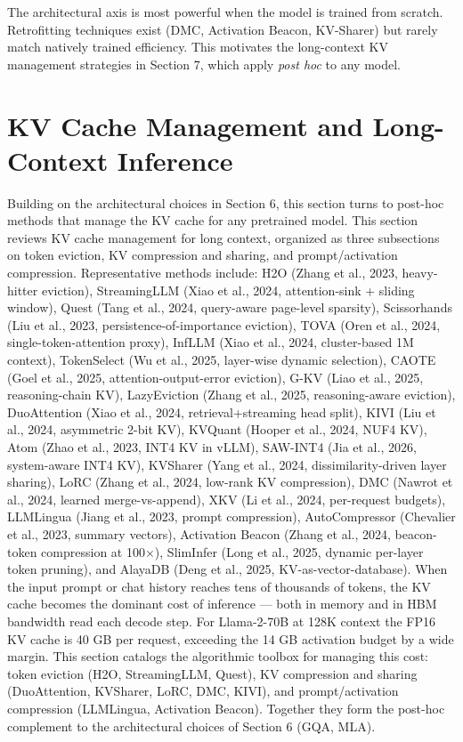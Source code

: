 \documentclass{article}
\begin{document}
The architectural axis is most powerful when the model is trained from scratch. Retrofitting techniques exist (DMC, Activation Beacon, KV-Sharer) but rarely match natively trained efficiency. This motivates the long-context KV management strategies in Section 7, which apply \emph{post hoc} to any model.

\section{KV Cache Management and Long-Context Inference}\label{kv-cache-management-and-long-context-inference}

Building on the architectural choices in Section 6, this section turns to post-hoc methods that manage the KV cache for any pretrained model. This section reviews KV cache management for long context, organized as three subsections on token eviction, KV compression and sharing, and prompt/activation compression. Representative methods include: H2O (Zhang et al., 2023, heavy-hitter eviction), StreamingLLM (Xiao et al., 2024, attention-sink + sliding window), Quest (Tang et al., 2024, query-aware page-level sparsity), Scissorhands (Liu et al., 2023, persistence-of-importance eviction), TOVA (Oren et al., 2024, single-token-attention proxy), InfLLM (Xiao et al., 2024, cluster-based 1M context), TokenSelect (Wu et al., 2025, layer-wise dynamic selection), CAOTE (Goel et al., 2025, attention-output-error eviction), G-KV (Liao et al., 2025, reasoning-chain KV), LazyEviction (Zhang et al., 2025, reasoning-aware eviction), DuoAttention (Xiao et al., 2024, retrieval+streaming head split), KIVI (Liu et al., 2024, asymmetric 2-bit KV), KVQuant (Hooper et al., 2024, NUF4 KV), Atom (Zhao et al., 2023, INT4 KV in vLLM), SAW-INT4 (Jia et al., 2026, system-aware INT4 KV), KVSharer (Yang et al., 2024, dissimilarity-driven layer sharing), LoRC (Zhang et al., 2024, low-rank KV compression), DMC (Nawrot et al., 2024, learned merge-vs-append), XKV (Li et al., 2024, per-request budgets), LLMLingua (Jiang et al., 2023, prompt compression), AutoCompressor (Chevalier et al., 2023, summary vectors), Activation Beacon (Zhang et al., 2024, beacon-token compression at 100×), SlimInfer (Long et al., 2025, dynamic per-layer token pruning), and AlayaDB (Deng et al., 2025, KV-as-vector-database). When the input prompt or chat history reaches tens of thousands of tokens, the KV cache becomes the dominant cost of inference --- both in memory and in HBM bandwidth read each decode step. For Llama-2-70B at 128K context the FP16 KV cache is 40 GB per request, exceeding the 14 GB activation budget by a wide margin. This section catalogs the algorithmic toolbox for managing this cost: token eviction (H2O, StreamingLLM, Quest), KV compression and sharing (DuoAttention, KVSharer, LoRC, DMC, KIVI), and prompt/activation compression (LLMLingua, Activation Beacon). Together they form the post-hoc complement to the architectural choices of Section 6 (GQA, MLA).
\end{document}
